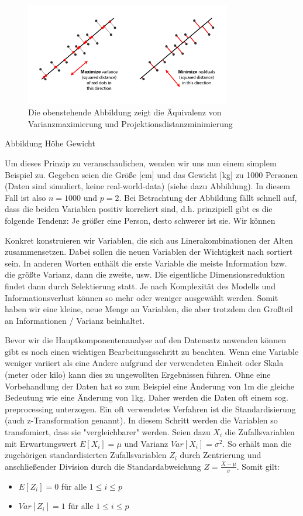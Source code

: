 \begin{figure}
\centering
\includegraphics[width = 0.8\textwidth]{figures/pca_projection_explanation.png}
\caption{Die obenstehende Abbildung zeigt die Äquivalenz von Varianzmaximierung und Projektionsdistanzminimierung}
\end{figure}

Abbildung Höhe Gewicht

Um dieses Prinzip zu veranschaulichen, wenden wir uns nun einem simplem Beispiel zu. Gegeben seien die Größe [cm] und das Gewicht [kg] zu 1000 Personen (Daten sind simuliert, keine real-world-data) (siehe dazu Abbildung). In diesem Fall ist also $n = 1000$ und $p = 2$. Bei Betrachtung der Abbildung fällt schnell auf, dass die beiden Variablen positiv korreliert sind, d.h. prinzipiell gibt es die folgende Tendenz: Je größer eine Person, desto schwerer ist sie. Wir können


Konkret konstruieren wir Variablen, die sich aus Linerakombinationen der Alten zusammensetzen. Dabei sollen die neuen Variablen der Wichtigkeit nach sortiert sein. In anderen Worten enthält die erste Variable die meiste Information bzw. die größte Varianz, dann die zweite, usw.
Die eigentliche Dimensionsreduktion findet dann durch Selektierung statt. Je nach Komplexität des Modells und Informationsverlust können so mehr oder weniger ausgewählt werden. Somit haben wir eine kleine, neue Menge an Variablen, die aber trotzdem den Großteil an Informationen / Varianz beinhaltet.

Bevor wir die Hauptkomponentenanalyse auf den Datensatz anwenden können gibt es noch einen wichtigen Bearbeitungsschritt zu beachten. Wenn eine Variable weniger variiert als eine Andere aufgrund der verwendeten Einheit oder Skala (meter oder kilo) kann dies zu ungewollten Ergebnissen führen. Ohne eine Vorbehandlung der Daten hat so zum Beispiel eine Änderung von 1m die gleiche Bedeutung wie eine Änderung von 1kg. Daher werden die Daten oft einem sog. preprocessing unterzogen. Ein oft verwendetes Verfahren ist die Standardisierung (auch z-Transformation genannt). In diesem Schritt werden die Variablen so transfomiert, dass sie "vergleichbarer" werden. Seien dazu $X_i$ die Zufallsvariablen mit Erwartungswert $E[X_i] = \mu$ und Varianz $Var[X_i] = \sigma^2$. So erhält man die zugehörigen standardisierten Zufallsvariablen $Z_i$ durch Zentrierung und anschließender Division durch die Standardabweichung $Z = \frac{X-\mu}{\sigma}$. Somit gilt:
\begin{itemize}
\item $E[Z_i] = 0$ für alle $1 \leq i \leq p$
\item $Var[Z_i] = 1$ für alle $1 \leq i \leq p$
\end{itemize}


